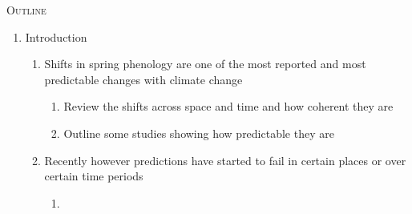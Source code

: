 \documentclass[11pt,letterpaper]{article}
\renewcommand{\section}[1]{%
\bigskip
\begin{center}
\begin{Large}
\normalfont\scshape #1
\medskip
\end{Large}
\end{center}}
\begin{document}
\section{Outline}
\begin{enumerate}
\item Introduction 
\begin{enumerate}
\item Shifts in spring phenology are one of the most reported and most predictable changes with climate change
\begin{enumerate}
\item Review the shifts across space and time and how coherent they are
\item Outline some studies showing how predictable they are \citep{Schwartz:1997nn,Ellwood2012}
\end{enumerate}
\item Recently however predictions have started to fail in certain places or over certain time periods
\begin{enumerate}
\item \citet{yu2010,fu2015} %

\end{enumerate}
\end{enumerate}
\end{enumerate}
\end{document}
